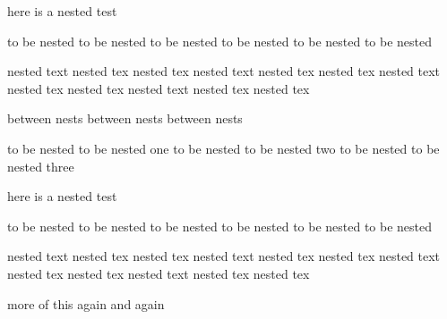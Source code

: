 here is a nested test
\begin{one}
 to be nested to be nested
 to be nested to be nested
 to be nested to be nested
 \begin{two}
  nested text nested tex nested tex
  nested text nested tex nested tex
  nested text nested tex nested tex
  nested text nested tex nested tex
 \end{two}
\end{one}
between nests
between nests
between nests
\begin{one}
 to be nested to be nested one
 to be nested to be nested       two
 to be nested to be nested           three
\end{one}
here is a nested test
\begin{one}
 to be nested to be nested
 to be nested to be nested
 to be nested to be nested
 \begin{two}
  nested text nested tex nested tex
  nested text nested tex nested tex
  nested text nested tex nested tex
  nested text nested tex nested tex
 \end{two}
\end{one}
more
of this
again
and again
